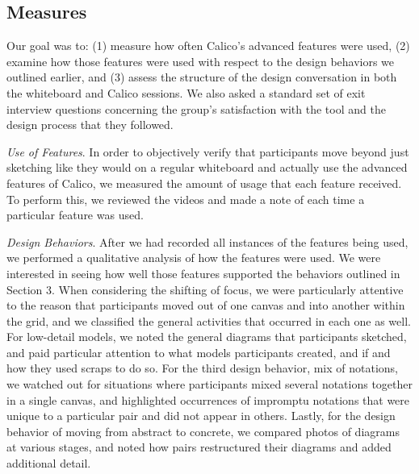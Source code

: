 \subsection {Measures}
\label{experimentaldesign:4}

Our goal was to: (1) measure how often Calico's advanced features were used, (2) examine how those features were used with respect to the design behaviors we outlined earlier, and (3) assess the structure of the design conversation in both the whiteboard and Calico sessions. We also asked a standard set of exit interview questions concerning the group's satisfaction with the tool and the design process that they followed.

    \emph{Use of Features}. In order to objectively verify that participants move beyond just sketching like they would on a regular whiteboard and actually use the advanced features of Calico, we measured the amount of usage that each feature received. To perform this, we reviewed the videos and made a note of each time a particular feature was used. 

    \emph{Design Behaviors}. After we had recorded all instances of the features being used, we performed a qualitative analysis of how the features were used. We were interested in seeing how well those features supported the behaviors outlined in Section 3. When considering the shifting of focus, we were particularly attentive to the reason that participants moved out of one canvas and into another within the grid, and we classified the general activities that occurred in each one as well. For low-detail models, we noted the general diagrams that participants sketched, and paid particular attention to what models participants created, and if and how they used scraps to do so. For the third design behavior, mix of notations, we watched out for situations where participants mixed several notations together in a single canvas, and highlighted occurrences of impromptu notations that were unique to a particular pair and did not appear in others. Lastly, for the design behavior of moving from abstract to concrete, we compared photos of diagrams at various stages, and noted how pairs restructured their diagrams and added additional detail.

